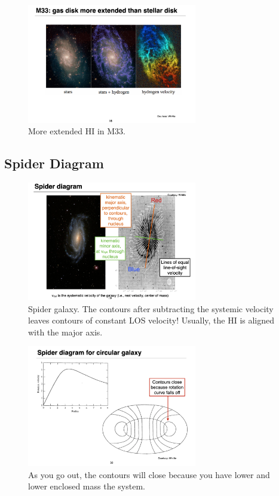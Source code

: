 \documentclass{article}
\begin{document}
\begin{figure}
    \centering
    \includegraphics[width=0.66\textwidth]{figs/Screen Shot 2021-10-22 at 10.14.53 AM.png}
    \caption{More extended HI in M33. }
    \label{fig:b0000m}
\end{figure}

\subsection{Spider Diagram}

\begin{figure}
    \centering
    \includegraphics[width=0.66\textwidth]{figs/Screen Shot 2021-10-22 at 10.18.35 AM.png}
    \caption{Spider galaxy. The contours after subtracting the systemic velocity leaves contours of constant LOS velocity! Usually, the HI is aligned with the major axis. }
    \label{fig:spider_diagram}
\end{figure}

\begin{figure}
    \centering
    \includegraphics[width=0.66\textwidth]{figs/Screen Shot 2021-10-22 at 10.20.34 AM.png}
    \caption{As you go out, the contours will close because you have lower and lower enclosed mass the system.}
    \label{fig:enclosed_mass_gives_circles}
\end{figure}
\end{document}
